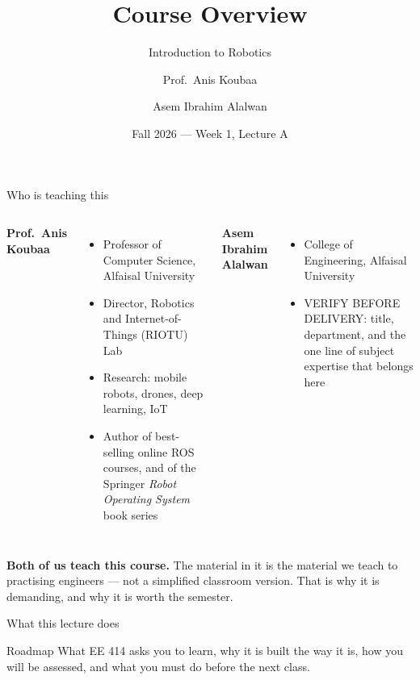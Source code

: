 \documentclass[aspectratio=169]{beamer}
\title[EE 414 --- Week 1A]{Course Overview}
\subtitle{Introduction to Robotics}
\author[Koubaa \and Alalwan]{Prof.\ Anis Koubaa \and Asem Ibrahim Alalwan}
\institute[Alfaisal University]{
    EE 414 --- Introduction to Robotics\\
    College of Engineering\\
    Alfaisal University
}
\date{Fall 2026 --- Week 1, Lecture A}
\begin{document}
\begin{frame}[plain]
  \titlepage
\end{frame}

\begin{frame}{Who is teaching this}
  \small
  \begin{columns}[T,onlytextwidth]
    \textbf{Prof.\ Anis Koubaa}
    \begin{itemize}\footnotesize
      \item Professor of Computer Science, Alfaisal University
      \item Director, Robotics and Internet-of-Things (RIOTU) Lab
      \item Research: mobile robots, drones, deep learning, IoT
      \item Author of best-selling online ROS courses, and of the Springer
            \emph{Robot Operating System} book series
    \end{itemize}

    \textbf{Asem Ibrahim Alalwan}
    \begin{itemize}\footnotesize
      \item College of Engineering, Alfaisal University
      \item VERIFY BEFORE DELIVERY: title, department, and the one line
            of subject expertise that belongs here
    \end{itemize}
  \end{columns}

  \vspace{0.7em}
  \begin{inthefield}
    \footnotesize
    \textbf{Both of us teach this course.} The material in it is the material we teach to
    practising engineers --- not a simplified classroom version. That is why it is demanding,
    and why it is worth the semester.
  \end{inthefield}
\end{frame}

\begin{frame}{What this lecture does}
  \begin{block}{Roadmap}
    \small What EE 414 asks you to learn, why it is built the way it is, how you will be
    assessed, and what you must do before the next class.
  \end{block}
  \vspace{0.2em}
  {\scriptsize\tableofcontents[hideallsubsections]}
\end{frame}
\end{document}
